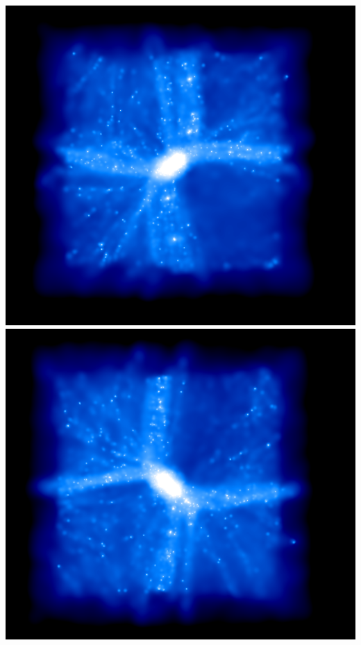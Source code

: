 \includegraphics[scale=0.2]{r256/h100/drd5_r256_2/1.png} 
\includegraphics[scale=0.2]{r256/h100/drd5_r256_2/2.png} 

